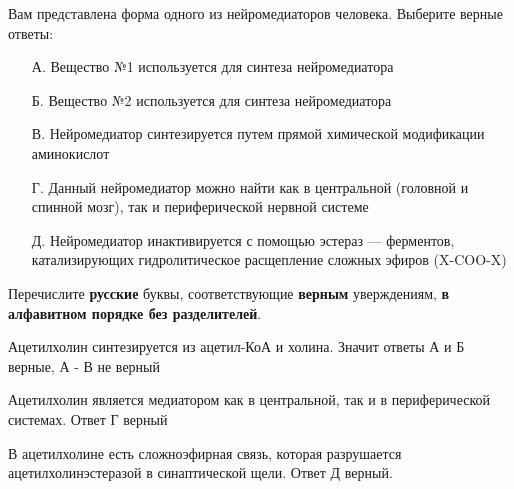 

Вам представлена форма одного из нейромедиаторов человека. Выберите верные ответы:
\begin{enumerate}
    \item[А.] Вещество №1 используется для синтеза нейромедиатора
    \item[Б.] Вещество №2 используется для синтеза нейромедиатора
    \item[В.] Нейромедиатор синтезируется путем прямой химической модификации аминокислот
    \item[Г.] Данный нейромедиатор можно найти как в центральной (головной и спинной мозг), так и периферической нервной системе
    \item[Д.] Нейромедиатор инактивируется с помощью эстераз — ферментов, катализирующих гидролитическое расщепление сложных эфиров (X-COO-X)
\end{enumerate} 

Перечислите \textbf{русские} буквы, соответствующие \textbf{верным} уверждениям, \textbf{в алфавитном порядке без разделителей}.

\solutionSection

Ацетилхолин синтезируется из ацетил-КоА и холина. Значит ответы А и Б верные, А - В не верный

Ацетилхолин является медиатором как в центральной, так и в периферической системах. Ответ Г верный

В ацетилхолине есть сложноэфирная связь, которая разрушается ацетилхолинэстеразой в синаптической щели. Ответ Д верный.


